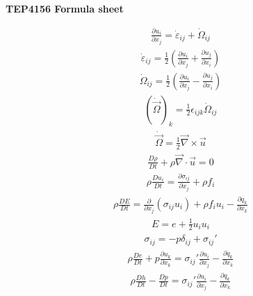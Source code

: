 \documentclass[10pt, a4paper]{article}
\begin{document}
\begin{center}
    \Large
    \textbf{TEP4156 Formula sheet}
\end{center}

\begin{multicols}{2}
\begin{gather*}
    \frac{\partial u_i}{\partial x_j} = \dot{\varepsilon}_{ij} + \dot{\Omega}_{ij}
\end{gather*}
\begin{gather*}
    \dot{\varepsilon}_{ij} = \frac12\left( \frac{\partial u_i}{\partial x_j} +
    \frac{\partial u_j}{\partial x_i}\right)
\end{gather*}
\begin{gather*}
    \dot{\Omega}_{ij} = \frac12\left( \frac{\partial u_i}{\partial x_j} -
    \frac{\partial u_j}{\partial x_i}\right)
\end{gather*}
\begin{gather*}
    (\dot{\vec{\Omega}})_k = \frac12 \epsilon_{ijk}\dot{\Omega}_{ij}
\end{gather*}
\begin{gather*}
    \dot{\vec{\Omega}} = \frac12 \vec{\nabla}\times\vec{u}
\end{gather*}
\begin{gather*}
    \frac{D\rho}{Dt} + \rho \vec{\nabla} \cdot \vec{u} = 0
\end{gather*}
\begin{gather*}
    \rho \frac{Du_i}{Dt} = \frac{\partial \sigma_{ij}}{\partial x_j} + \rho f_i
\end{gather*}
\begin{gather*}
    \rho \frac{DE}{Dt} = \frac{\partial}{\partial x_j}(\sigma_{ij} u_i) + \rho f_i u_i - \frac{\partial q_k}{\partial x_k}
\end{gather*}
\begin{gather*}
    E = e + \frac12 u_i u_i
\end{gather*}
\begin{gather*}
    \sigma_{ij} = -p \delta_{ij} + \sigma_{ij}'
\end{gather*}
\begin{gather*}
    \rho \frac{De}{Dt} + p\frac{\partial u_k}{\partial x_k} =
    \sigma_{ij}' \frac{\partial u_i}{\partial x_j}  - \frac{\partial q_k}{\partial x_k}
\end{gather*}
\begin{gather*}
    \rho \frac{Dh}{Dt} - \frac{Dp}{Dt} =
    \sigma_{ij}' \frac{\partial u_i}{\partial x_j}  - \frac{\partial q_k}{\partial x_k}
\end{gather*}

\end{multicols}
\end{document}
